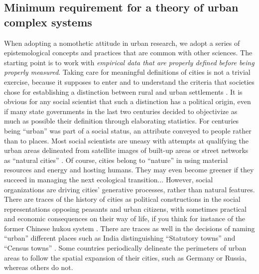 \documentclass[10pt,letterpaper]{article}
\begin{document}
\subsection{Minimum requirement for a theory of urban complex systems}

When adopting a nomothetic attitude in urban research, we adopt a series of epistemological concepts and practices that are common with other sciences. The starting point is to work with \textit{empirical data that are properly defined before being properly measured}. Taking care for meaningful definitions of cities is not a trivial exercise, because it supposes to enter and to understand the criteria that societies chose for establishing a distinction between rural and urban settlements \citep{rozenblat2020extending}. It is obvious for any social scientist that such a distinction has a political origin, even if many state governments in the last two centuries decided to objectivize as much as possible their definition through elaborating statistics. For centuries being ``urban'' was part of a social status, an attribute conveyed to people rather than to places. Most social scientists are uneasy with attempts at qualifying the urban areas delineated from satellite images of built-up areas or street networks as ``natural cities'' \citep{jiang2015zipf}. Of course, cities belong to ``nature'' in using material resources and energy and hosting humans. They may even become greener if they succeed in managing the next ecological transition... However, social organizations are driving cities' generative processes, rather than natural features. There are traces of the history of cities as political constructions in the social representations opposing peasants and urban citizens, with sometimes practical and economic consequences on their way of life, if you think for instance of the former Chinese hukou system \citep{wu2020emerging}. There are traces as well in the decisions of naming ``urban'' different places such as India distinguishing ``Statutory towns'' and ``Census towns'' \citep{swerts2018diffuse}. Some countries periodically delineate the perimeters of urban areas to follow the spatial expansion of their cities, such as Germany or Russia, whereas others do not.
\end{document}
